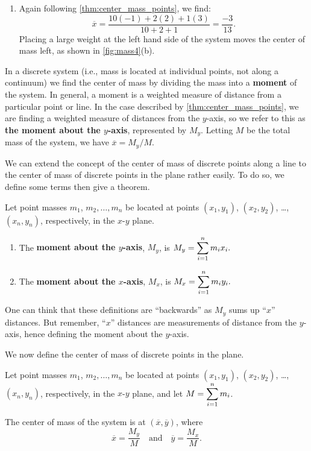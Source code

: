 \begin{example}
\begin{enumerate}
	\item	Again following \autoref{thm:center_mass_points}, we find:
	\[\overline{x} = \frac{10(-1)+2(2)+1(3)}{10+2+1} = \frac{-3}{13}%
	.\]
	Placing a large weight at the left hand side of the system moves the center of mass left, as shown in \autoref{fig:mass4}(b).
\end{enumerate}
\end{example}

In a discrete system (i.e., mass is located at individual points, not along a continuum) we find the center of mass by dividing the mass into a \textbf{moment} of the system. In general, a moment is a weighted measure of distance from a particular point or line. In the case described by \autoref{thm:center_mass_points}, we are finding a weighted measure of distances from the $y$-axis, so we refer to this as \textbf{the moment about the $y$-axis}, represented by $M_y$.  Letting $M$ be the total mass of the system, we have  $\overline{x} = M_y/M$. 

We can extend the concept of the center of mass of discrete points along a line to the center of mass of discrete points in the plane rather easily. To do so, we define some terms then give a theorem.

\begin{definition}\label{def:moment}%
Let point masses $m_1$, $m_2,\dots,m_n$ be located at points $(x_1,y_1)$, $(x_2,y_2)$, \dots, $(x_n,y_n)$, respectively, in the $x$-$y$ plane. 
\begin{enumerate}
	\item The \textbf{moment about the $y$-axis}, $M_y$, is 
	$\displaystyle M_y = \sum_{i=1}^n m_ix_i.$
	\item The \textbf{moment about the $x$-axis}, $M_x$, is 
	$\displaystyle M_x = \sum_{i=1}^n m_iy_i.$
	\end{enumerate}
\end{definition}

One can think that these definitions are ``backwards'' as $M_y$ sums up ``$x$'' distances. But remember, ``$x$'' distances are measurements of distance from the $y$-axis, hence defining the moment about the $y$-axis.

We now define the center of mass of discrete points in the plane.

\begin{theorem}\label{thm:center_mass_points_plane}%
Let point masses $m_1$, $m_2,\dots,m_n$ be located at points $(x_1,y_1)$, $(x_2,y_2)$, \dots, $(x_n,y_n)$, respectively, in the $x$-$y$ plane, and let $\displaystyle M = \sum_{i=1}^n m_i$.  

The center of mass of the system is at $(\overline{x},\overline{y})$, where 
\[\overline{x}= \frac{M_y}{M}\quad \text{and}\quad \overline{y} = \frac{M_x}{M}.\]
\end{theorem}


